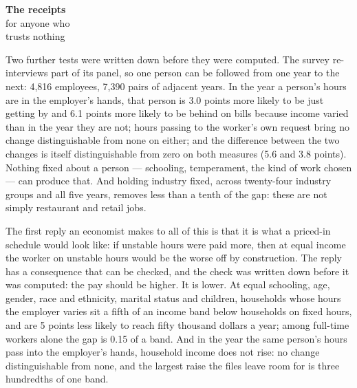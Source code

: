 \begin{receipts}{\textbf{The receipts}\\for anyone who\\trusts nothing}

Two further tests were written down before they were computed. The
survey re-interviews part of its panel, so one person can be followed
from one year to the next: 4,816 employees, 7,390 pairs of adjacent
years. In the year a person's hours are in the employer's hands, that
person is 3.0 points more likely to be just getting by and 6.1 points
more likely to be behind on bills because income varied than in the
year they are not; hours passing to the worker's own request bring
no change distinguishable from none on either; and the difference
between the two changes is itself distinguishable from zero on both
measures (5.6 and 3.8 points).
Nothing fixed about a person --- schooling, temperament, the kind of
work chosen --- can produce that. And holding industry fixed, across
twenty-four industry groups and all five years, removes less than a tenth
of the gap: these are not simply restaurant and retail jobs.

The first reply an economist makes to all of this is that it is what
a priced-in schedule would look like: if unstable hours were paid
more, then at equal income the worker on unstable hours would be the
worse off by construction. The reply has a consequence that can be
checked, and the check was written down before it was computed: the
pay should be higher. It is lower. At equal schooling, age, gender,
race and ethnicity, marital status and children, households whose
hours the employer varies sit a fifth of an income band below
households on fixed hours, and are 5 points less likely to reach fifty
thousand dollars a year; among full-time workers alone the gap is 0.15
of a band. And in the year the same person's hours pass into the
employer's hands, household income does not rise: no change
distinguishable from none, and the largest raise the files leave room
for is three hundredths of one band.



\end{receipts}
